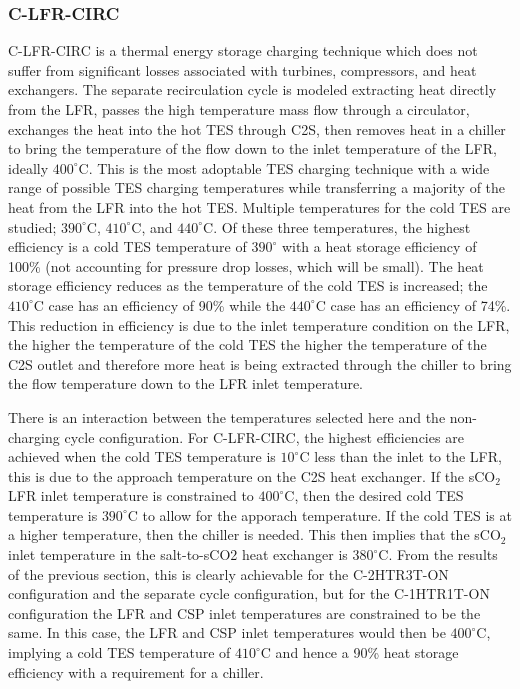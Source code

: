 \begin{paracol}{2}
\subsubsection{C-LFR-CIRC}

C-LFR-CIRC is a thermal energy storage charging technique which does not suffer from significant losses associated with turbines, compressors, and heat exchangers. The separate recirculation cycle is modeled extracting heat directly from the LFR, passes the high temperature mass flow through a circulator, exchanges the heat into the hot TES through C2S, then removes heat in a chiller to bring the temperature of the flow down to the inlet temperature of the LFR, ideally $400^{\circ}$C. This is the most adoptable TES charging technique with a wide range of possible TES charging temperatures while transferring a majority of the heat from the LFR into the hot TES. Multiple temperatures for the cold TES are studied; $390^{\circ}$C, $410^{\circ}$C, and $440^{\circ}$C. Of these three temperatures, the highest efficiency is a cold TES temperature of $390^{\circ}$ with a heat storage efficiency of 100\% (not accounting for pressure drop losses, which will be small). The heat storage efficiency reduces as the temperature of the cold TES is increased; the $410^{\circ}$C case has an efficiency of 90\% while the $440^{\circ}$C case has an efficiency of 74\%. This reduction in efficiency is due to the inlet temperature condition on the LFR, the higher the temperature of the cold TES the higher the temperature of the C2S outlet and therefore more heat is being extracted through the chiller to bring the flow temperature down to the LFR inlet temperature. 

There is an interaction between the temperatures selected here and the non-charging cycle configuration. For C-LFR-CIRC, the highest efficiencies are achieved when the cold TES temperature is $10^{\circ}$C less than the inlet to the LFR, this is due to the approach temperature on the C2S heat exchanger. If the sCO$_2$ LFR inlet temperature is constrained to $400^{\circ}$C, then the desired cold TES temperature is $390^{\circ}$C to allow for the apporach temperature. If the cold TES is at a higher temperature, then the chiller is needed. This then implies that the sCO$_2$ inlet temperature in the salt-to-sCO2 heat exchanger is  $380^{\circ}$C. From the results of the previous section, this is clearly achievable for the C-2HTR3T-ON configuration and the separate cycle configuration, but for the C-1HTR1T-ON configuration the LFR and CSP inlet temperatures are constrained to be the same. In this case, the LFR and CSP inlet temperatures would then be $400^{\circ}$C, implying a cold TES temperature of  $410^{\circ}$C and hence a 90\% heat storage efficiency with a requirement for a chiller.



\end{paracol}
